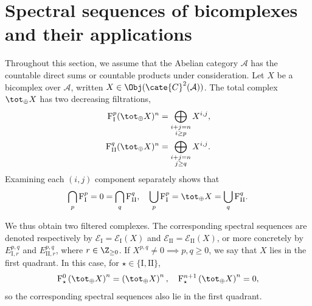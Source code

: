
\section{Spectral sequences of bicomplexes and their applications}
\label{sec:double-cplx-ss}
\hypertarget{o014.aljabr2.chapter5.bicomplex-spectral-sequences-applications}{ }

Throughout this section, we assume that the Abelian category $\mathcal{A}$
has the countable direct sums or countable products under consideration. Let
$X$ be a bicomplex over $\mathcal{A}$, written
$X\in\Obj(\cate{C}^2(\mathcal{A}))$. The total complex $\tot_{\oplus}X$ has
two decreasing filtrations,
\begin{align*}
	\mathrm{F}^p_{\mathrm{I}} (\tot_{\oplus} X)^n & = \bigoplus_{\substack{i+j=n \\ i \geq p}} X^{i, j}, \\
	\mathrm{F}^q_{\mathrm{II}} (\tot_{\oplus} X)^n & = \bigoplus_{\substack{i+j=n \\ j \geq q}} X^{i, j} .
\end{align*}
Examining each $(i,j)$ component separately shows that
\[ \bigcap_p \mathrm{F}^p_{\mathrm{I}} = 0 = \bigcap_q \mathrm{F}^q_{\mathrm{II}}, \quad \bigcup_p \mathrm{F}^p_{\mathrm{I}} = \tot_{\oplus} X = \bigcup_q \mathrm{F}^q_{\mathrm{II}}. \]

We thus obtain two filtered complexes. The corresponding spectral sequences
are denoted respectively by
$\mathscr{E}_{\mathrm{I}}=\mathscr{E}_{\mathrm{I}}(X)$ and
$\mathscr{E}_{\mathrm{II}}=\mathscr{E}_{\mathrm{II}}(X)$, or more concretely
by $E_{\mathrm{I},r}^{p,q}$ and $E_{\mathrm{II},r}^{p,q}$, where
$r\in\Z_{\geq0}$. If $X^{p,q}\neq0\implies p,q\geq0$, we say that $X$
lies in the first quadrant. In this case, for
$\star\in\{\mathrm{I},\mathrm{II}\}$,
\[ \mathrm{F}_\star^0 \left(\tot_{\oplus} X \right)^n = \left(\tot_{\oplus} X\right)^n, \quad \mathrm{F}_\star^{n+1} \left(\tot_{\oplus} X \right)^n = 0 , \]
so the corresponding spectral sequences also lie in the first quadrant.


